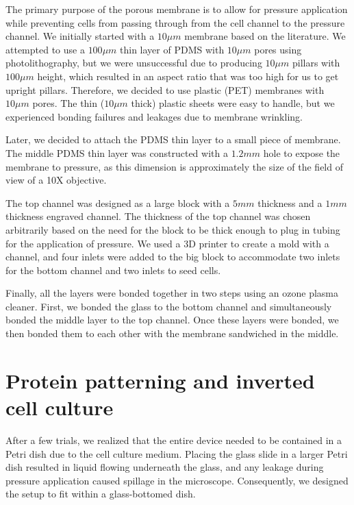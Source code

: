 The primary purpose of the porous membrane is to allow for pressure
application while preventing cells from passing through from the cell
channel to the pressure channel. We initially started with a \(10\mu m\)
membrane based on the literature. We attempted to use a \(100 \mu m\)
thin layer of PDMS with \(10\mu m\) pores using photolithography, but we
were unsuccessful due to producing \(10\mu m\) pillars with
\(100 \mu m\) height, which resulted in an aspect ratio that was too
high for us to get upright pillars. Therefore, we decided to use plastic
(PET) membranes with \(10\mu m\) pores. The thin (\(10\mu m\) thick)
plastic sheets were easy to handle, but we experienced bonding failures
and leakages due to membrane wrinkling.

Later, we decided to attach the PDMS thin layer to a small piece of
membrane. The middle PDMS thin layer was constructed with a \(1.2 mm\)
hole to expose the membrane to pressure, as this dimension is
approximately the size of the field of view of a 10X objective.

The top channel was designed as a large block with a \(5mm\) thickness
and a \(1mm\) thickness engraved channel. The thickness of the top
channel was chosen arbitrarily based on the need for the block to be
thick enough to plug in tubing for the application of pressure. We used
a 3D printer to create a mold with a channel, and four inlets were added
to the big block to accommodate two inlets for the bottom channel and
two inlets to seed cells.

Finally, all the layers were bonded together in two steps using an ozone
plasma cleaner. First, we bonded the glass to the bottom channel and
simultaneously bonded the middle layer to the top channel. Once these
layers were bonded, we then bonded them to each other with the membrane
sandwiched in the middle.


\hypertarget{protein-patterning-and-inverted-cell-culture}{%
\section{Protein patterning and inverted cell
culture}\label{protein-patterning-and-inverted-cell-culture}}

After a few trials, we realized that the entire device needed to be
contained in a Petri dish due to the cell culture medium. Placing the
glass slide in a larger Petri dish resulted in liquid flowing underneath
the glass, and any leakage during pressure application caused spillage
in the microscope. Consequently, we designed the setup to fit within a
glass-bottomed dish.

